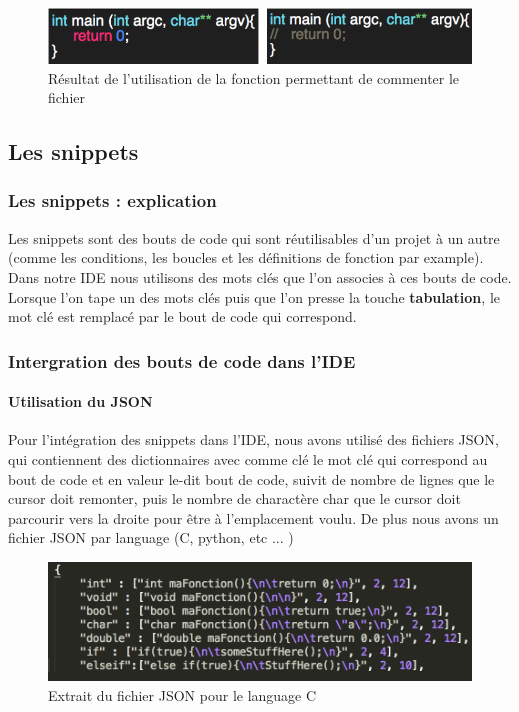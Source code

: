 \documentclass[a4paper,12pt]{article}
\begin{document}
	\begin{figure}[h!]
		\begin{center}
			\includegraphics[scale=0.8]{images/imgs_edit/resultat_commentaire}
			\caption{Résultat de l'utilisation de la fonction permettant de commenter le fichier}
		\end{center}
	\end{figure}
	
\subsection{Les snippets}
	
	\subsubsection{Les snippets : explication}

		Les snippets sont des bouts de code qui sont réutilisables d'un projet à un autre (comme les conditions, les boucles et les définitions de fonction par example). Dans notre IDE nous utilisons des mots clés que l'on associes à ces bouts de code. Lorsque l'on tape un des mots clés puis que l'on presse la touche \textbf{tabulation}, le mot clé est remplacé par le bout de code qui correspond.

	\subsubsection{Intergration des bouts de code dans l'IDE}

		\paragraph{Utilisation du JSON}

			Pour l'intégration des snippets dans l'IDE, nous avons utilisé des fichiers JSON, qui contiennent des dictionnaires avec comme clé le mot clé qui correspond au bout de code et en valeur le-dit bout de code, suivit de nombre de lignes que le cursor doit remonter, puis le nombre de charactère char que le cursor doit parcourir vers la droite pour être à l'emplacement voulu. De plus nous avons un fichier JSON par language (C, python, etc ... )

			\begin{figure}[h!]
				\begin{center}
					\includegraphics[scale=0.7]{images/exempleJSON}
					\caption{Extrait du fichier JSON pour le language C}
				\end{center}
			\end{figure}
\end{document}
